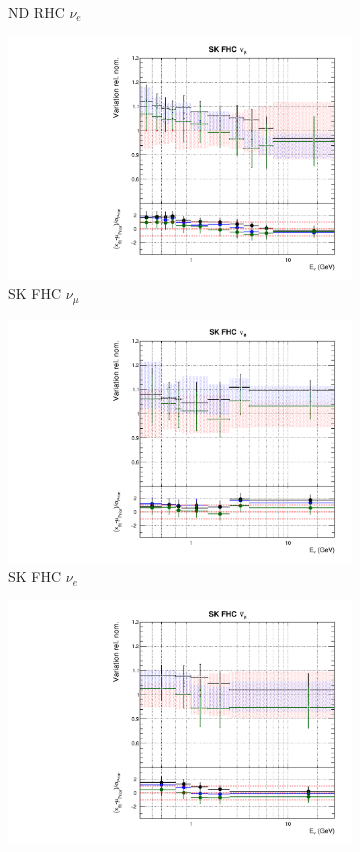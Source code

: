 \begin{figure}
\begin{subfigure}{0.24\textwidth}
  \caption{ND RHC $\nu_e$}
\end{subfigure}
\begin{subfigure}{0.24\textwidth}
  \centering
  \includegraphics[width=0.95\linewidth]{figs/fhcrhcfitsflux_8}
  \caption{SK FHC $\nu_{\mu}$}
\end{subfigure}
\begin{subfigure}{0.24\textwidth}
  \centering
  \includegraphics[width=0.95\linewidth]{figs/fhcrhcfitsflux_9}
  \caption{SK FHC $\nu_e$}
\end{subfigure}
\begin{subfigure}{0.24\textwidth}
  \centering
  \includegraphics[width=0.95\linewidth]{figs/fhcrhcfitsflux_10}

\end{subfigure}
\end{figure}
